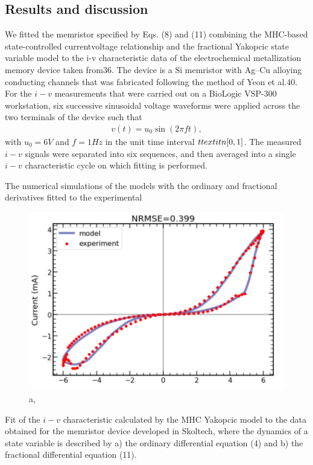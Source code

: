 \documentclass{article}
\begin{document}
{\begin{multicols}{2}
{{\section{Results and discussion}
}
We fitted the memristor specified by Eqs. (8) and (11) combining the MHC-based state-controlled currentvoltage relationship and the fractional Yakopcic state variable model to the i-v characteristic data of the electrochemical metallization memory device taken from36. The device is a Si memristor with Ag–Cu alloying conducting channels that was fabricated following the method of Yeon et al.40. For the $i-v$ measurements that were carried out on a BioLogic VSP-300 workstation, six successive sinusoidal voltage waveforms were applied across the two terminals of the device such that
\begin{align}
   v(t) = u_0 \sin(2\pi ft),
\end{align}
with $u_0 = 6 V$ and $f = 1 Hz$ in the unit time interval $t \\textit{n [0,1]}$. The measured $i-v$ signals were separated
into six sequences, and then averaged into a single $i-v$ characteristic cycle on which fitting is performed. \par
The numerical simulations of the models with the ordinary and fractional derivatives fitted to the experimental
\begin{figure}
    \includegraphics[scale=0.8]{latex_figure_a.png}
    \caption{a,}
    \label{fig:my_label}
\end{figure}
Fit of the $i-v$ characteristic calculated by the MHC Yakopcic model to the data obtained for the memristor device
developed in Skoltech, where the dynamics of a state variable
is described by a) the ordinary differential equation (4) and
b) the fractional differential equation (11).
}
\end{multicols}}
\end{document}
